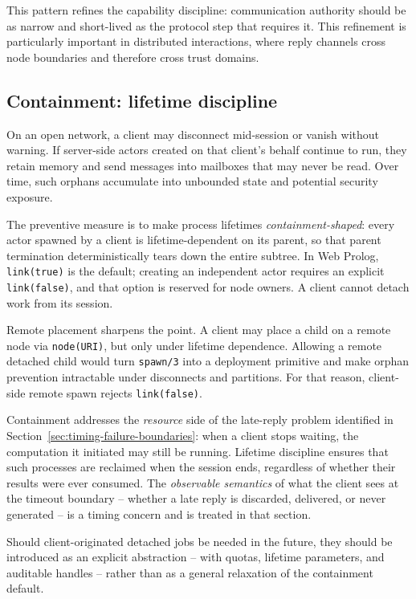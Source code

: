 This pattern refines the capability discipline: communication authority should be as narrow and short-lived as the protocol step that requires it. This refinement is particularly important in distributed interactions, where reply channels cross node boundaries and therefore cross trust domains.

\subsection{Containment: lifetime discipline}\label{sec:containment}

On an open network, a client may disconnect mid-session or vanish
without warning. If server-side actors created on that client's
behalf continue to run, they retain memory and send messages into
mailboxes that may never be read. Over time, such orphans accumulate
into unbounded state and potential security exposure.

The preventive measure is to make process lifetimes
\emph{containment-shaped}: every actor spawned by a client is
lifetime-dependent on its parent, so that parent termination
deterministically tears down the entire subtree. In Web Prolog,
\texttt{link(true)} is the default; creating an independent actor
requires an explicit \texttt{link(false)}, and that option is
reserved for node owners. A client
cannot detach work from its session.

Remote placement sharpens the point. A client may place a child on a
remote node via \texttt{node(URI)}, but only under lifetime
dependence. Allowing a remote detached child would turn
\texttt{spawn/3} into a deployment primitive and make orphan
prevention intractable under disconnects and partitions. For that
reason, client-side remote spawn rejects \texttt{link(false)}.

Containment addresses the \emph{resource} side of the late-reply
problem identified in Section~\ref{sec:timing-failure-boundaries}:
when a client stops waiting, the computation it initiated may still
be running. Lifetime discipline ensures that such processes are
reclaimed when the session ends, regardless of whether their results
were ever consumed. The \emph{observable semantics} of what the
client sees at the timeout boundary -- whether a late reply is
discarded, delivered, or never generated -- is a timing concern and
is treated in that section.

Should client-originated detached jobs be needed in the future, they
should be introduced as an explicit abstraction -- with quotas,
lifetime parameters, and auditable handles -- rather than as a
general relaxation of the containment default.

